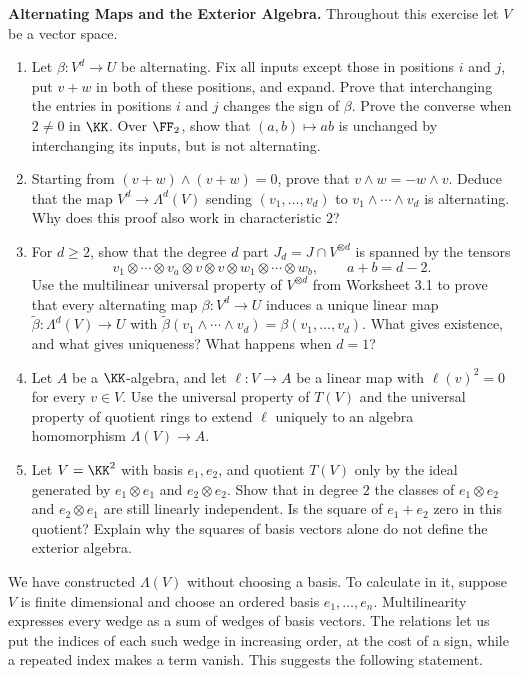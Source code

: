 \documentclass[12pt,reqno]{amsart}
\begin{document}
\begin{problems}
\item\label{e:construction} \textbf{Alternating Maps and the Exterior Algebra.} Throughout this exercise let $V$ be a vector space.
\begin{enumerate}
\item Let $\beta:V^d\to U$ be alternating. Fix all inputs except those in positions $i$ and $j$, put $v+w$ in both of these positions, and expand. Prove that interchanging the entries in positions $i$ and $j$ changes the sign of $\beta$. Prove the converse when $2\ne0$ in $\KK$. Over $\FF_2$, show that $(a,b)\mapsto ab$ is unchanged by interchanging its inputs, but is not alternating.
\item Starting from $(v+w)\wedge(v+w)=0$, prove that $v\wedge w=-w\wedge v$. Deduce that the map $V^d\to\Lambda^d(V)$ sending $(v_1,\ldots,v_d)$ to $v_1\wedge\cdots\wedge v_d$ is alternating. Why does this proof also work in characteristic $2$?
\item For $d\geq2$, show that the degree $d$ part $J_d=J\cap V^{\otimes d}$ is spanned by the tensors
\[
v_1\otimes\cdots\otimes v_a\otimes v\otimes v\otimes w_1\otimes\cdots\otimes w_b,\qquad a+b=d-2.
\]
Use the multilinear universal property of $V^{\otimes d}$ from Worksheet 3.1 to prove that every alternating map $\beta:V^d\to U$ induces a unique linear map $\widetilde\beta:\Lambda^d(V)\to U$ with $\widetilde\beta(v_1\wedge\cdots\wedge v_d)=\beta(v_1,\ldots,v_d)$. What gives existence, and what gives uniqueness? What happens when $d=1$?
\item Let $A$ be a $\KK$-algebra, and let $\ell:V\to A$ be a linear map with $\ell(v)^2=0$ for every $v\in V$. Use the universal property of $T(V)$ and the universal property of quotient rings to extend $\ell$ uniquely to an algebra homomorphism $\Lambda(V)\to A$.
\item Let $V=\KK^2$ with basis $e_1,e_2$, and quotient $T(V)$ only by the ideal generated by $e_1\otimes e_1$ and $e_2\otimes e_2$. Show that in degree $2$ the classes of $e_1\otimes e_2$ and $e_2\otimes e_1$ are still linearly independent. Is the square of $e_1+e_2$ zero in this quotient? Explain why the squares of basis vectors alone do not define the exterior algebra.
\end{enumerate}
\end{problems}

\hrulefill

We have constructed $\Lambda(V)$ without choosing a basis. To calculate in it, suppose $V$ is finite dimensional and choose an ordered basis $e_1,\ldots,e_n$. Multilinearity expresses every wedge as a sum of wedges of basis vectors. The relations let us put the indices of each such wedge in increasing order, at the cost of a sign, while a repeated index makes a term vanish. This suggests the following statement.
\end{document}
